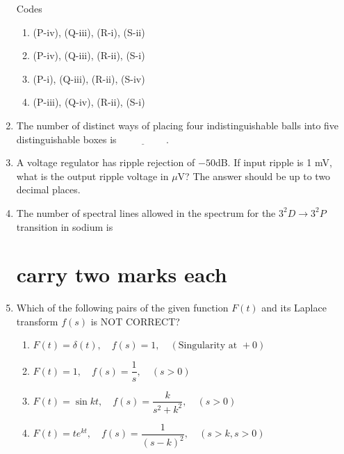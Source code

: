 \documentclass[journal]{IEEEtran}
\theoremstyle{remark}
\begin{document}
\begin{enumerate}
Codes 

\begin{enumerate}
    \item (P-iv), (Q-iii), (R-i), (S-ii)
    \item (P-iv), (Q-iii), (R-ii), (S-i)
    \item (P-i), (Q-iii), (R-ii), (S-iv)
    \item (P-iii), (Q-iv), (R-ii), (S-i)
\end{enumerate}

\item The number of distinct ways of placing four indistinguishable balls into five distinguishable boxes is $\underline{\hspace{2cm}}$.

\item A voltage regulator has ripple rejection of $-50$dB. If input ripple is 1 mV, what is the output ripple voltage in $\mu$V? The answer should be up to two decimal places.

\underline{\hspace{2cm}}

\item The number of spectral lines allowed in the spectrum for the $3^2D \rightarrow 3^2P$ transition in sodium is

\underline{\hspace{2cm}}

\section{carry two marks each}
\item Which of the following pairs of the given function $F(t)$ and its Laplace transform $f(s)$ is NOT CORRECT?


\begin{enumerate}
    \item $F(t)=\delta(t), \quad f(s)=1, \quad (\text{Singularity at }+0)$
    \item $F(t)=1, \quad f(s)=\dfrac{1}{s}, \quad (s>0)$
    \item $F(t)=\sin kt, \quad f(s)=\dfrac{k}{s^2+k^2}, \quad (s>0)$
    \item $F(t)=te^{kt}, \quad f(s)=\dfrac{1}{(s-k)^2}, \quad (s>k, s>0)$
\end{enumerate}




\end{enumerate}
\end{document}
